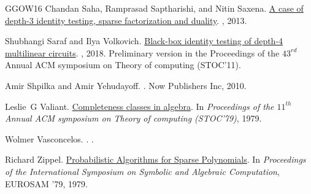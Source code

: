 \documentclass[10pt,a4paper]{article}
\numberwithin{equation}{section}
\begin{document}
\begin{thebibliography}{GGOW16}
Chandan Saha, Ramprasad Saptharishi, and Nitin Saxena.
\newblock \href{https://link.springer.com/article/10.1007/s00037-012-0054-4}{A
  case of depth-3 identity testing, sparse factorization and duality}.
, 2013.

Shubhangi Saraf and Ilya Volkovich.
\newblock
  \href{https://link.springer.com/article/10.1007/s00493-016-3460-4}{Black-box
  identity testing of depth-4 multilinear circuits}.
, 2018.
\newblock Preliminary version in the Proceedings of the $43^{rd}$ Annual ACM
  symposium on Theory of computing (STOC'11).

Amir Shpilka and Amir Yehudayoff.
.
\newblock Now Publishers Inc, 2010.

Leslie~G Valiant.
\newblock \href{https://dl.acm.org/doi/10.1145/800135.804419}{Completeness
  classes in algebra}.
\newblock In {\em Proceedings of the $11^{th}$ Annual ACM symposium on Theory
  of computing (STOC'79)}, 1979.

Wolmer Vasconcelos.
.
.

Richard Zippel.
\newblock
  \href{https://link.springer.com/chapter/10.1007/3-540-09519-5_73}{Probabilistic
  Algorithms for Sparse Polynomials}.
\newblock In {\em Proceedings of the International Symposium on Symbolic and
  Algebraic Computation}, EUROSAM '79, 1979.

\end{thebibliography}
\end{document}
